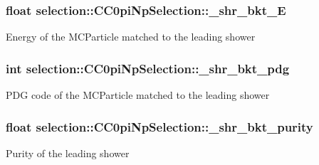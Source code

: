 \subsubsection[{\texorpdfstring{\+\_\+shr\+\_\+bkt\+\_\+E}{_shr_bkt_E}}]{\setlength{\rightskip}{0pt plus 5cm}float selection\+::\+C\+C0pi\+Np\+Selection\+::\+\_\+shr\+\_\+bkt\+\_\+E\hspace{0.3cm}{\ttfamily [private]}}\hypertarget{classselection_1_1CC0piNpSelection_aa1a21f48d99a4de5f1d444aa3d64dedf}{}\label{classselection_1_1CC0piNpSelection_aa1a21f48d99a4de5f1d444aa3d64dedf}
Energy of the M\+C\+Particle matched to the leading shower 
\subsubsection[{\texorpdfstring{\+\_\+shr\+\_\+bkt\+\_\+pdg}{_shr_bkt_pdg}}]{\setlength{\rightskip}{0pt plus 5cm}int selection\+::\+C\+C0pi\+Np\+Selection\+::\+\_\+shr\+\_\+bkt\+\_\+pdg\hspace{0.3cm}{\ttfamily [private]}}\hypertarget{classselection_1_1CC0piNpSelection_aab09f93d7cd57031de714956414f3230}{}\label{classselection_1_1CC0piNpSelection_aab09f93d7cd57031de714956414f3230}
P\+DG code of the M\+C\+Particle matched to the leading shower 
\subsubsection[{\texorpdfstring{\+\_\+shr\+\_\+bkt\+\_\+purity}{_shr_bkt_purity}}]{\setlength{\rightskip}{0pt plus 5cm}float selection\+::\+C\+C0pi\+Np\+Selection\+::\+\_\+shr\+\_\+bkt\+\_\+purity\hspace{0.3cm}{\ttfamily [private]}}\hypertarget{classselection_1_1CC0piNpSelection_a1da68886d5b7a5b4eb1785649c48e8ef}{}\label{classselection_1_1CC0piNpSelection_a1da68886d5b7a5b4eb1785649c48e8ef}
Purity of the leading shower 
